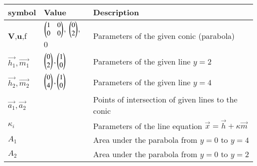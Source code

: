 \begin{tabular}{|m{5em} | m{7em} | m{10em} |}
    \hline
    \textbf{symbol} & \textbf{Value} & \textbf{Description}\\
    \hline
        \textbf{V},\textbf{u},f & $\begin{pmatrix} 1 & 0\\0 & 0\end{pmatrix}$, $\begin{pmatrix}0\\2\end{pmatrix}$, 0 & Parameters of the given conic (parabola)\\
    \hline
        $\vec{h_1}, \vec{m_1}$ & $\begin{pmatrix}0\\2\end{pmatrix}, \begin{pmatrix}1\\0\end{pmatrix}$ & Parameters of the given line $y = 2$\\
    \hline
        $\vec{h_2}, \vec{m_2}$ & $\begin{pmatrix}0\\4\end{pmatrix}, \begin{pmatrix}1\\0\end{pmatrix}$ & Parameters of the given line $y = 4$\\
    \hline
        $\vec{a_1}, \vec{a_2}$ & & Points of intersection of given lines to the conic\\
    \hline
        $\kappa_i$ & & Parameters of the line equation $\vec{x} = \vec{h} + \kappa\vec{m}$\\
    \hline
        $A_1$ & & Area under the parabola from $y=0$ to $y=4$\\
    \hline
        $A_2$ & & Area under the parabola from $y=0$ to $y=2$\\
    \hline
\end{tabular}
